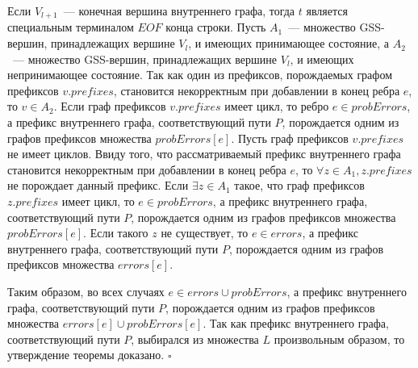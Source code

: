 Если $V_{l+1}$~--- конечная вершина внутреннего графа, тогда $t$ является специальным терминалом $EOF$ конца строки. Пусть $A_{1}$~--- множество GSS-вершин, принадлежащих вершине $V_{l}$, и имеющих принимающее состояние, а $A_{2}$~--- множество GSS-вершин, принадлежащих вершине $V_{l}$, и имеющих непринимающее состояние. Так как один из префиксов, порождаемых графом префиксов $v.prefixes$, становится некорректным при добавлении в конец ребра $e$, то $v \in A_{2}$. Если граф префиксов $v.prefixes$ имеет цикл, то ребро $e \in probErrors$, а префикс внутреннего графа, соответствующий пути $P$, порождается одним из графов префиксов множества $probErrors[e]$. Пусть граф префиксов $v.prefixes$ не имеет циклов. Ввиду того, что рассматриваемый префикс внутреннего графа становится некорректным при добавлении в конец ребра $e$, то $\forall z \in A_{1}, z.prefixes$ не порождает данный префикс. Если $\exists z \in A_{1}$ такое, что граф префиксов $z.prefixes$ имеет цикл, то $e \in probErrors$, а префикс внутреннего графа, соответствующий пути $P$, порождается одним из графов префиксов множества $probErrors[e]$. Если такого $z$ не существует, то $e \in errors$, а префикс внутреннего графа, соответствующий пути $P$, порождается одним из графов префиксов множества $errors[e]$.

Таким образом, во всех случаях $e \in errors \cup probErrors$, а префикс внутреннего графа, соответствующий пути $P$, порождается одним из графов префиксов множества $errors[e] \cup probErrors[e]$. Так как префикс внутреннего графа, соответствующий пути $P$, выбирался из множества $L$ произвольным образом, то утверждение теоремы доказано.
$\square$

